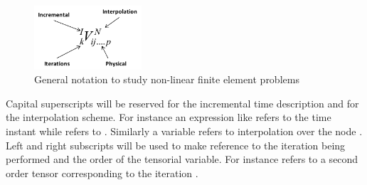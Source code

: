 \begin{figure}[h]
\centering
\includegraphics[width=4cm]{img/figure1_1.pdf}
\caption{General notation to study non-linear finite element problems}
\label{fig:notation}
\end{figure}

 Capital superscripts will be reserved for the incremental time description and for the interpolation scheme.  For instance an expression like   refers to the time instant   while   refers to  .  Similarly a variable   refers to interpolation over the node  .  Left and right subscripts will be used to make reference to the iteration being performed and the order of the tensorial variable.  For instance   refers to a second order tensor corresponding to the iteration  .




